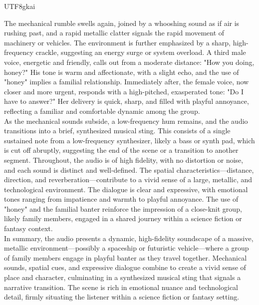 \begin{CJK*}{UTF8}{gkai}
\begin{tcolorbox}
The mechanical rumble swells again, joined by a whooshing sound as if air is rushing past, and a rapid metallic clatter signals the rapid movement of machinery or vehicles. The environment is further emphasized by a sharp, high-frequency crackle, suggesting an energy surge or system overload. A third male voice, energetic and friendly, calls out from a moderate distance: "How you doing, honey?" His tone is warm and affectionate, with a slight echo, and the use of "honey" implies a familial relationship. Immediately after, the female voice, now closer and more urgent, responds with a high-pitched, exasperated tone: "Do I have to answer?" Her delivery is quick, sharp, and filled with playful annoyance, reflecting a familiar and comfortable dynamic among the group.\\

As the mechanical sounds subside, a low-frequency hum remains, and the audio transitions into a brief, synthesized musical sting. This consists of a single sustained note from a low-frequency synthesizer, likely a bass or synth pad, which is cut off abruptly, suggesting the end of the scene or a transition to another segment. Throughout, the audio is of high fidelity, with no distortion or noise, and each sound is distinct and well-defined. The spatial characteristics—distance, direction, and reverberation—contribute to a vivid sense of a large, metallic, and technological environment. The dialogue is clear and expressive, with emotional tones ranging from impatience and warmth to playful annoyance. The use of "honey" and the familial banter reinforce the impression of a close-knit group, likely family members, engaged in a shared journey within a science fiction or fantasy context.\\

In summary, the audio presents a dynamic, high-fidelity soundscape of a massive, metallic environment—possibly a spaceship or futuristic vehicle—where a group of family members engage in playful banter as they travel together. Mechanical sounds, spatial cues, and expressive dialogue combine to create a vivid sense of place and character, culminating in a synthesized musical sting that signals a narrative transition. The scene is rich in emotional nuance and technological detail, firmly situating the listener within a science fiction or fantasy setting.


\end{tcolorbox}
\end{CJK*}








